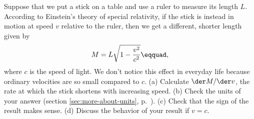 Suppose that we put a stick on a table and use a ruler
to measure its length $L$.
According to Einstein's theory of special relativity,
if the stick is instead in motion at speed $v$ relative to the ruler, then
we get a different, shorter length given by
\begin{equation*}
  M = L\sqrt{1-\frac{v^2}{c^2}}\eqquad,
\end{equation*}
where $c$ is the speed of light. We don't notice this effect in
everyday life because ordinary velocities are so small compared
to $c$.
(a) Calculate $\der M/\der v$, the rate at which the stick shortens
with increasing speed. (b) Check the units of your answer (section \ref{sec:more-about-units}, p.~\pageref{sec:more-about-units}).
(c) Check that the sign of the result makes sense.
(d) Discuss the behavior of your result if $v=c$.\answercheck
